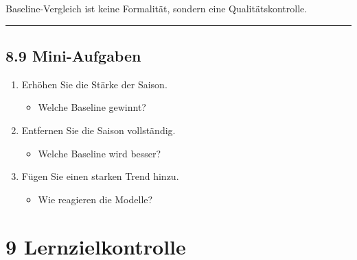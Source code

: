 \documentclass[
  ngerman,
  letterpaper,
  DIV=11]{scrreprt}
\providecommand{\tightlist}{%
  \setlength{\itemsep}{0pt}\setlength{\parskip}{0pt}}
\begin{document}
\begin{tcolorbox}[enhanced jigsaw, titlerule=0mm, title=\textcolor{quarto-callout-tip-color}{\faLightbulb}\hspace{0.5em}{Methodischer Hinweis}, bottomrule=.15mm, opacityback=0, colbacktitle=quarto-callout-tip-color!10!white, coltitle=black, opacitybacktitle=0.6, colframe=quarto-callout-tip-color-frame, toprule=.15mm, leftrule=.75mm, arc=.35mm, rightrule=.15mm, breakable, bottomtitle=1mm, colback=white, toptitle=1mm, left=2mm]

Baseline-Vergleich ist keine Formalität, sondern eine
Qualitätskontrolle.

\end{tcolorbox}

\begin{center}\rule{0.5\linewidth}{0.5pt}\end{center}

\section{8.9 Mini-Aufgaben}\label{mini-aufgaben-4}

\begin{enumerate}
\def\labelenumi{\arabic{enumi}.}
\tightlist
\item
  Erhöhen Sie die Stärke der Saison.

  \begin{itemize}
  \tightlist
  \item
    Welche Baseline gewinnt?
  \end{itemize}
\item
  Entfernen Sie die Saison vollständig.

  \begin{itemize}
  \tightlist
  \item
    Welche Baseline wird besser?
  \end{itemize}
\item
  Fügen Sie einen starken Trend hinzu.

  \begin{itemize}
  \tightlist
  \item
    Wie reagieren die Modelle?
  \end{itemize}
\end{enumerate}


\chapter{9 Lernzielkontrolle}\label{lernzielkontrolle}
\end{document}
